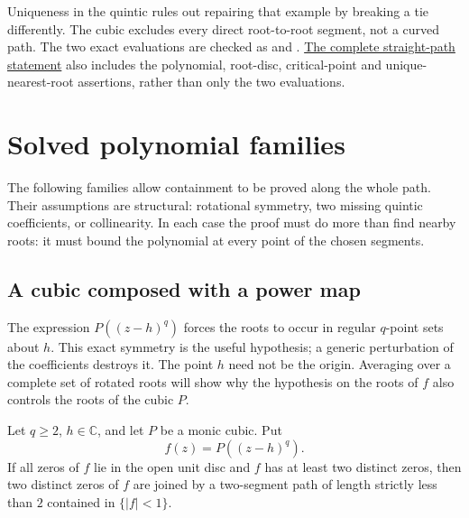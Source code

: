 \documentclass[11pt]{article}
\begin{document}
Uniqueness in the quintic rules out repairing that example by breaking a
tie differently. The cubic excludes every direct root-to-root segment,
not a curved path. The two exact evaluations are checked as
 and
.
\href{https://github.com/wcook04/plectis-erdos/blob/0b500c7cf8e8bb7ae343484378df02f277fb8194/lean/ErdosProblems/Erdos1041/PaperStraightObstructions.lean#L178}{The complete straight-path statement} also includes the polynomial,
root-disc, critical-point and unique-nearest-root assertions, rather than
only the two evaluations.

\section{Solved polynomial families}
\label{sec:solved-families}

The following families allow containment to be proved along the whole
path. Their assumptions are structural: rotational symmetry, two missing
quintic coefficients, or collinearity. In each case the proof must do more
than find nearby roots: it must bound the polynomial at every point of
the chosen segments.

\subsection{A cubic composed with a power map}

The expression $P((z-h)^q)$ forces the roots to occur in regular
$q$-point sets about $h$. This exact symmetry is the useful hypothesis;
a generic perturbation of the coefficients destroys it. The point $h$
need not be the origin. Averaging over a complete set of rotated roots
will show why the hypothesis on the roots of $f$ also controls the roots
of the cubic $P$.

\begin{theorem}
\label{res:cubic-fibres}
Let $q\ge2$, $h\in\mathbb C$, and let $P$ be a monic cubic.  Put
\[
  f(z)=P((z-h)^q).
\]
If all zeros of $f$ lie in the open unit disc and $f$ has at least two
distinct zeros, then two distinct zeros of $f$ are joined by a two-segment
path of length strictly less than $2$ contained in $\{|f|<1\}$.
\end{theorem}
\end{document}
